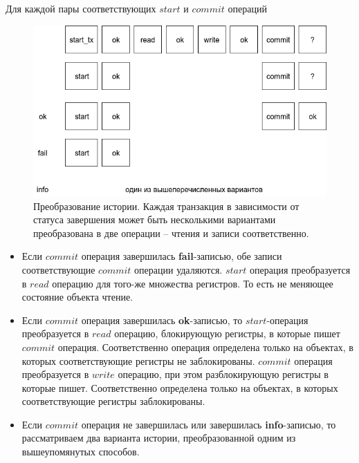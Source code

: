 \documentclass[pdftex,ptm,14pt,a4paper]{extreport}
\theoremstyle{definition}
\begin{document}
Для каждой пары соответствующих $start$ и $commit$ операций

\begin{figure}
    \includegraphics[scale=0.5]{history-transform.png}
    \caption{Преобразование истории. Каждая транзакция  в зависимости от
        статуса завершения может быть несколькими вариантами преобразована в две операции --
        чтения и записи соответственно.}
\end{figure}

\begin{itemize}
    \item Если $commit$ операция завершилась \textbf{fail}-записью, обе записи
        соответствующие $commit$ операции удаляются.
        $start$ операция преобразуется в $read$ операцию для того-же множества регистров.
        То есть не меняющее состояние объекта чтение.
    \item Если $commit$ операция завершилась \textbf{ok}-записью, то
        $start$-операция преобразуется в $read$ операцию, блокирующую регистры,
        в которые пишет $commit$ операция. Соответственно операция определена только на объектах,
        в которых соответствующие регистры не заблокированы. $commit$ операция преобразуется в
        $write$ операцию, при этом разблокирующую регистры в которые пишет.
        Соответственно определена только на объектах, в которых соответствующие регистры заблокированы.
    \item Если $commit$ операция не завершилась или завершилась \textbf{info}-записью, то рассматриваем два варианта истории,
        преобразованной одним из вышеупомянутых способов.
\end{itemize}
\end{document}
